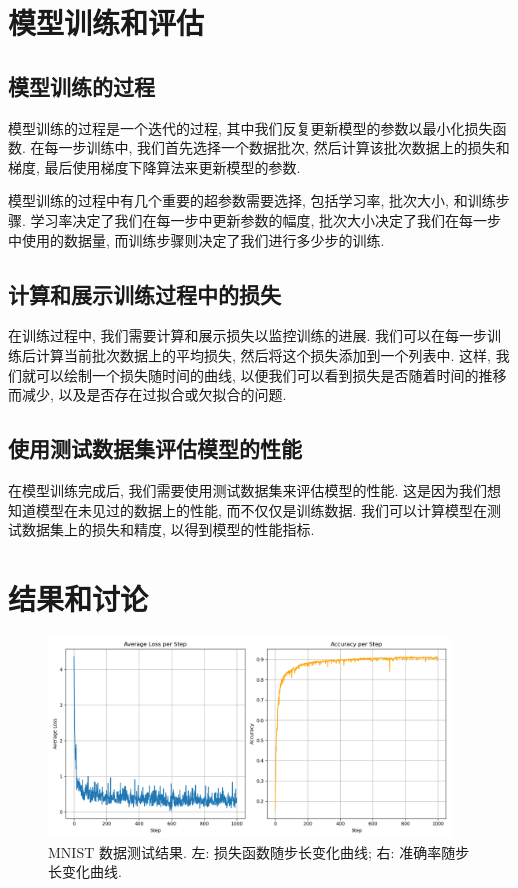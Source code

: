 \documentclass{ctexart}
\begin{document}
\section{模型训练和评估}
\label{sec::training}

\subsection{模型训练的过程}

模型训练的过程是一个迭代的过程, 其中我们反复更新模型的参数以最小化损失函数. 在每一步训练中,
我们首先选择一个数据批次, 然后计算该批次数据上的损失和梯度, 最后使用梯度下降算法来更新模型的参数.

模型训练的过程中有几个重要的超参数需要选择, 包括学习率, 批次大小, 和训练步骤. 学习率决定了我们在每一步中更新参数的幅度,
批次大小决定了我们在每一步中使用的数据量, 而训练步骤则决定了我们进行多少步的训练.

\subsection{计算和展示训练过程中的损失}

在训练过程中, 我们需要计算和展示损失以监控训练的进展. 我们可以在每一步训练后计算当前批次数据上的平均损失,
然后将这个损失添加到一个列表中. 这样, 我们就可以绘制一个损失随时间的曲线, 以便我们可以看到损失是否随着时间的推移而减少, 以及是否存在过拟合或欠拟合的问题.

\subsection{使用测试数据集评估模型的性能}

在模型训练完成后, 我们需要使用测试数据集来评估模型的性能. 这是因为我们想知道模型在未见过的数据上的性能,
而不仅仅是训练数据. 我们可以计算模型在测试数据集上的损失和精度, 以得到模型的性能指标.

\section{结果和讨论}
\label{sec::results}

\begin{figure}[htbp!]
    \centering
    \includegraphics[width=0.95\textwidth]{images/result.png}
    \caption{MNIST 数据测试结果. 左: 损失函数随步长变化曲线; 右: 准确率随步长变化曲线.}
    \label{fig::result}
\end{figure}
\end{document}
